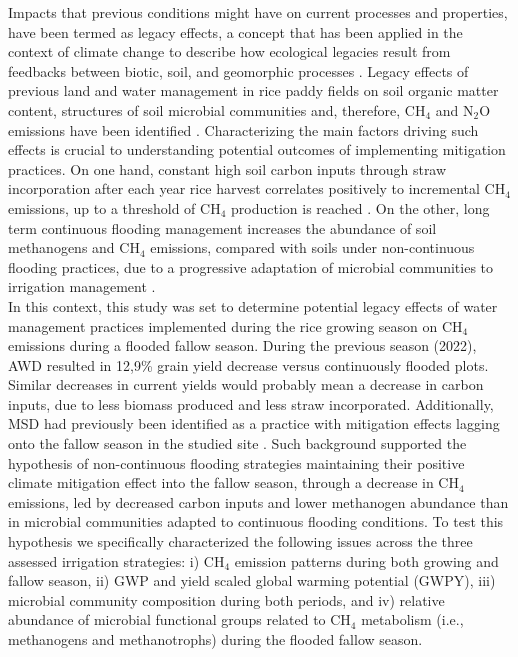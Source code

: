 
Impacts that previous conditions might have on current processes and properties, have been termed as legacy effects, a concept that has been applied in the context of climate change to describe how ecological legacies result from feedbacks between biotic, soil, and geomorphic processes \citep{monger2015legacy}. Legacy effects of previous land and water management in rice paddy fields on soil organic matter content, structures of soil microbial communities and, therefore, CH$_{4}$ and N$_{2}$O emissions have been identified \citep{shao2017, tian2022}. Characterizing the main factors driving such effects is crucial to understanding potential outcomes of implementing mitigation practices. On one hand, constant high soil carbon inputs through straw incorporation after each year rice harvest correlates positively to incremental CH$_{4}$ emissions, up to a threshold of CH$_{4}$ production is reached \citep{hatala2012}. On the other, long term continuous flooding management increases the abundance of soil methanogens and CH$_{4}$ emissions, compared with soils under non-continuous flooding practices, due to a progressive adaptation of microbial communities to irrigation management \citep{lagomarsino2016}.\\


In this context, this study was set to determine potential legacy effects of water management practices implemented during the rice growing season on CH$_{4}$ emissions during a flooded fallow season. During the previous season (2022), AWD resulted in 12,9\% grain yield decrease versus continuously flooded plots. Similar decreases in current yields would probably mean a decrease in carbon inputs, due to less biomass produced and less straw incorporated. Additionally, MSD had previously been identified as a practice with mitigation effects lagging onto the fallow season in the studied site \citep{martinez-eixarch2022}. Such background supported the hypothesis of non-continuous flooding strategies maintaining their positive climate mitigation effect into the fallow season, through a decrease in CH$_{4}$ emissions, led by decreased carbon inputs and lower methanogen abundance than in microbial communities adapted to continuous flooding conditions. To test this hypothesis we specifically characterized the following issues across the three assessed irrigation strategies: i) CH$_{4}$ emission patterns during both growing and fallow season, ii) GWP and yield scaled global warming potential (GWPY), iii) microbial community composition during both periods, and iv) relative abundance of microbial functional groups related to CH$_{4}$ metabolism (i.e., methanogens and methanotrophs) during the flooded fallow season.\\

